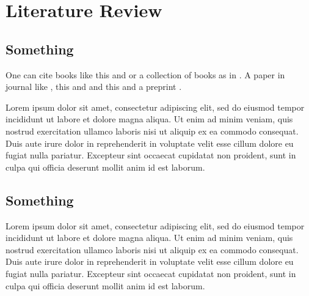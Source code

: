 \chapter{Literature Review}


\section{Something}

One can cite books like this\autocite{russell2003artificial} and \autocite{michael2005artificial}
or a collection of books as in \autocite{machinery1950computing}.
A paper in journal like \autocite{deng2012imagenet}, this \autocite{duchi2011adaptive}
and \autocite{he2015convolutional} and this \autocite{bello2017neural} and a preprint \autocite{iandola2016squeezenet}.


Lorem ipsum dolor sit amet, consectetur adipiscing elit,
sed do eiusmod tempor incididunt ut labore et dolore magna aliqua.
Ut enim ad minim veniam, quis nostrud exercitation ullamco laboris nisi ut aliquip ex ea commodo consequat.
Duis aute irure dolor in reprehenderit in voluptate velit esse cillum dolore eu fugiat nulla pariatur.
Excepteur sint occaecat cupidatat non proident, sunt in culpa qui officia deserunt mollit anim id est laborum.

\section{Something}

Lorem ipsum dolor sit amet, consectetur adipiscing elit,
sed do eiusmod tempor incididunt ut labore et dolore magna aliqua.
Ut enim ad minim veniam, quis nostrud exercitation ullamco laboris nisi ut aliquip ex ea commodo consequat.
Duis aute irure dolor in reprehenderit in voluptate velit esse cillum dolore eu fugiat nulla pariatur.
Excepteur sint occaecat cupidatat non proident, sunt in culpa qui officia deserunt mollit anim id est laborum.
